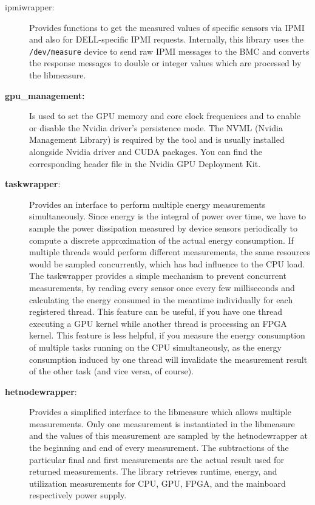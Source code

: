 \begin{description}
	\item[ipmiwrapper:] Provides functions to get the measured values of specific sensors via IPMI and also for DELL-specific IPMI requests. Internally, this library uses the \texttt{/dev/measure} device to send raw IPMI messages to the BMC and converts the response messages to double or integer values which are processed by the libmeasure. 
	
	\item[\textbf{gpu\_management:}] Is used to set the GPU memory and core clock frequenices and to enable or disable the Nvidia driver's persistence mode. The NVML (Nvidia Management Library) is required by the tool and is usually installed alongside Nvidia driver and CUDA packages. You can find the corresponding header file in the Nvidia GPU Deployment Kit.
	
	\item[\textbf{taskwrapper}:] Provides an interface to perform multiple energy measurements simultaneously. Since energy is the integral of power over time, we have to sample the power dissipation measured by device sensors periodically to compute a discrete approximation of the actual energy consumption. If multiple threads would perform different measurements, the same resources would be sampled concurrently, which has bad influence to the CPU load. The taskwrapper provides a simple mechanism to prevent concurrent measurements, by reading every sensor once every few milliseconds and calculating the energy consumed in the meantime individually for each registered thread. This feature can be useful, if you have one thread executing a GPU kernel while another thread is processing an FPGA kernel. This feature is less helpful, if you measure the energy consumption of multiple tasks running on the CPU simultaneously, as the energy consumption induced by one thread will invalidate the measurement result of the other task (and vice versa, of course).
	
	\item[\textbf{hetnodewrapper}:] Provides a simplified interface to the libmeasure which allows multiple measurements. Only one measurement is instantiated in the libmeasure and the values of this measurement are sampled by the hetnodewrapper at the beginning and end of every measurement. The subtractions of the particular final and first measurements are the actual result used for returned measurements. The library retrieves runtime, energy, and utilization measurements for CPU, GPU, FPGA, and the mainboard respectively power supply.
	

\end{description}
